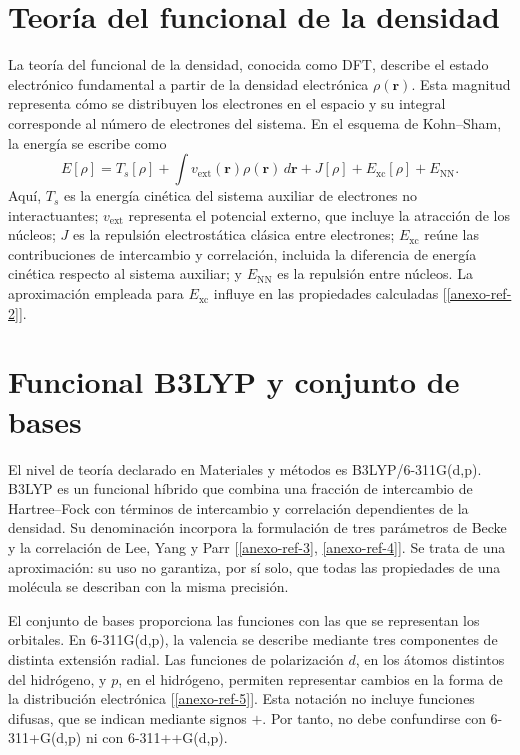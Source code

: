 \documentclass[12 pt, letter, oneside]{book}
\begin{document}
\section{Teoría del funcional de la densidad}
La teoría del funcional de la densidad, conocida como DFT, describe el estado electrónico fundamental a partir de la densidad electrónica $\rho(\mathbf r)$. Esta magnitud representa cómo se distribuyen los electrones en el espacio y su integral corresponde al número de electrones del sistema. En el esquema de Kohn--Sham, la energía se escribe como
\begin{equation}
 E[\rho]=T_s[\rho]+\int v_{\mathrm{ext}}(\mathbf r)\rho(\mathbf r)\,d\mathbf r
 +J[\rho]+E_{\mathrm{xc}}[\rho]+E_{\mathrm{NN}}.
\end{equation}
Aquí, $T_s$ es la energía cinética del sistema auxiliar de electrones no interactuantes; $v_{\mathrm{ext}}$ representa el potencial externo, que incluye la atracción de los núcleos; $J$ es la repulsión electrostática clásica entre electrones; $E_{\mathrm{xc}}$ reúne las contribuciones de intercambio y correlación, incluida la diferencia de energía cinética respecto al sistema auxiliar; y $E_{\mathrm{NN}}$ es la repulsión entre núcleos. La aproximación empleada para $E_{\mathrm{xc}}$ influye en las propiedades calculadas [\ref{anexo-ref-2}].

\section{Funcional B3LYP y conjunto de bases}
El nivel de teoría declarado en Materiales y métodos es B3LYP/6-311G(d,p). B3LYP es un funcional híbrido que combina una fracción de intercambio de Hartree--Fock con términos de intercambio y correlación dependientes de la densidad. Su denominación incorpora la formulación de tres parámetros de Becke y la correlación de Lee, Yang y Parr [\ref{anexo-ref-3}, \ref{anexo-ref-4}]. Se trata de una aproximación: su uso no garantiza, por sí solo, que todas las propiedades de una molécula se describan con la misma precisión.

El conjunto de bases proporciona las funciones con las que se representan los orbitales. En 6-311G(d,p), la valencia se describe mediante tres componentes de distinta extensión radial. Las funciones de polarización $d$, en los átomos distintos del hidrógeno, y $p$, en el hidrógeno, permiten representar cambios en la forma de la distribución electrónica [\ref{anexo-ref-5}]. Esta notación no incluye funciones difusas, que se indican mediante signos $+$. Por tanto, no debe confundirse con 6-311+G(d,p) ni con 6-311++G(d,p).
\end{document}
